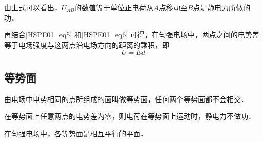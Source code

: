 由上式可以看出，$U_{AB}$的数值等于单位正电荷从$A$点移动至$B$点是静电力所做的功．

再结合\autoref{HSPE01_eq5} 和\autoref{HSPE01_eq6} 可得，在匀强电场中，两点之间的电势差等于电场强度与这两点沿电场方向的距离的乘积，即
\begin{equation}
U=Ed
\end{equation}

\subsection{等势面}

由电场中电势相同的点所组成的面叫做等势面，任何两个等势面都不会相交．

在等势面上任意两点的电势差为零，则电荷在等势面上运动时，静电力不做功．

在匀强电场中，各等势面是相互平行的平面．
